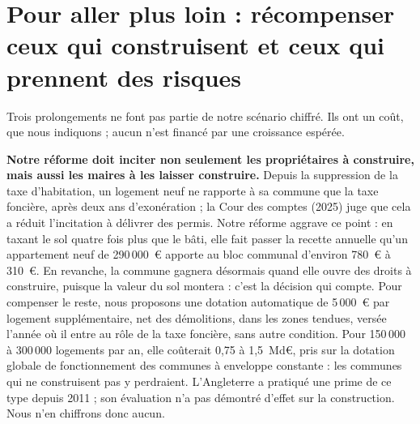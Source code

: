 \section{Pour aller plus loin : récompenser ceux qui construisent et ceux qui prennent des risques}

Trois prolongements ne font pas partie de notre scénario chiffré. Ils ont un coût, que nous indiquons ; aucun n'est
financé par une croissance espérée.

\textbf{Notre réforme doit inciter non seulement les propriétaires à construire, mais aussi les maires à les laisser
construire.} Depuis la suppression de la taxe d'habitation, un logement neuf ne rapporte à sa commune que la taxe
foncière, après deux ans d'exonération ; la Cour des comptes (2025) juge que cela a réduit l'incitation à délivrer des
permis. Notre réforme aggrave ce point : en taxant le sol quatre fois plus que le bâti, elle fait passer la recette
annuelle qu'un appartement neuf de 290\,000~€ apporte au bloc communal d'environ 780~€ à 310~€. En revanche, la commune
gagnera désormais quand elle ouvre des droits à construire, puisque la valeur du sol montera : c'est la décision qui
compte. Pour compenser le reste, nous proposons une dotation automatique de 5\,000~€ par logement supplémentaire, net
des démolitions, dans les zones tendues, versée l'année où il entre au rôle de la taxe foncière, sans autre condition.
Pour 150\,000 à 300\,000 logements par an, elle coûterait 0,75 à 1,5~Md€, pris sur la dotation globale de
fonctionnement des communes à enveloppe constante : les communes qui ne construisent pas y perdraient. L'Angleterre a
pratiqué une prime de ce type depuis 2011 ; son évaluation n'a pas démontré d'effet sur la construction. Nous
n'en chiffrons donc aucun.

